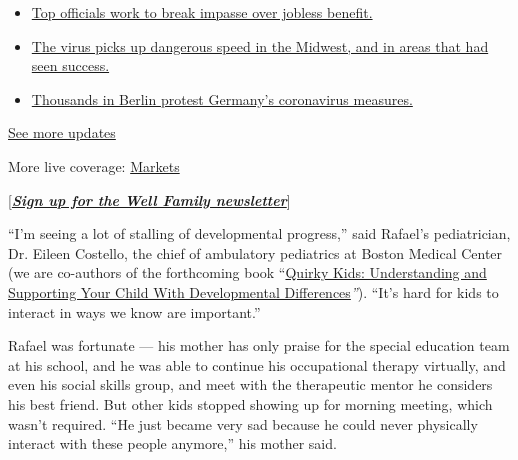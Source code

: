 \begin{itemize}
\tightlist
\item
  \href{https://www.nytimes.com/2020/08/01/world/coronavirus-covid-19.html?action=click\&pgtype=Article\&state=default\&region=MAIN_CONTENT_1\&context=storylines_live_updates\#link-3ac56579}{Top
  officials work to break impasse over jobless benefit.}
\item
  \href{https://www.nytimes.com/2020/08/01/world/coronavirus-covid-19.html?action=click\&pgtype=Article\&state=default\&region=MAIN_CONTENT_1\&context=storylines_live_updates\#link-8796723}{The
  virus picks up dangerous speed in the Midwest, and in areas that had
  seen success.}
\item
  \href{https://www.nytimes.com/2020/08/01/world/coronavirus-covid-19.html?action=click\&pgtype=Article\&state=default\&region=MAIN_CONTENT_1\&context=storylines_live_updates\#link-25930521}{Thousands
  in Berlin protest Germany's coronavirus measures.}
\end{itemize}

\href{https://www.nytimes.com/2020/08/01/world/coronavirus-covid-19.html?action=click\&pgtype=Article\&state=default\&region=MAIN_CONTENT_1\&context=storylines_live_updates}{See
more updates}

More live coverage:
\href{https://www.nytimes.com/live/2020/07/31/business/stock-market-today-coronavirus?action=click\&pgtype=Article\&state=default\&region=MAIN_CONTENT_1\&context=storylines_live_updates}{Markets}

{[}\textbf{\href{https://www.nytimes.com/newsletters/well-family}{\emph{Sign
up for the Well Family newsletter}}}{]}

``I'm seeing a lot of stalling of developmental progress,'' said
Rafael's pediatrician, Dr. Eileen Costello, the chief of ambulatory
pediatrics at Boston Medical Center (we are co-authors of the
forthcoming book
``\href{https://shop.aap.org/quirky-kids-2nd-edition-paperback/}{Quirky
Kids: Understanding and Supporting Your Child With Developmental
Differences}\emph{''}). ``It's hard for kids to interact in ways we know
are important.''

Rafael was fortunate --- his mother has only praise for the special
education team at his school, and he was able to continue his
occupational therapy virtually, and even his social skills group, and
meet with the therapeutic mentor he considers his best friend. But other
kids stopped showing up for morning meeting, which wasn't required. ``He
just became very sad because he could never physically interact with
these people anymore,'' his mother said.

